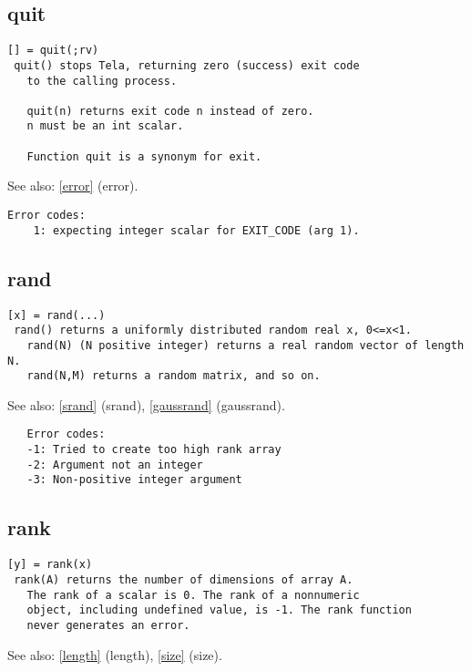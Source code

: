 \documentclass[a4paper]{article}
\begin{document}
\subsection{quit\label{quit}}

\begin{tscreen}
\begin{verbatim}
[] = quit(;rv)
 quit() stops Tela, returning zero (success) exit code
   to the calling process.

   quit(n) returns exit code n instead of zero.
   n must be an int scalar.

   Function quit is a synonym for exit.
\end{verbatim}

See also: \ref{error} {(error)}.
\begin{verbatim}
Error codes:
    1: expecting integer scalar for EXIT_CODE (arg 1).
\end{verbatim}
\end{tscreen}



\subsection{rand\label{rand}}

\begin{tscreen}
\begin{verbatim}
[x] = rand(...)
 rand() returns a uniformly distributed random real x, 0<=x<1.
   rand(N) (N positive integer) returns a real random vector of length N.
   rand(N,M) returns a random matrix, and so on.
\end{verbatim}

See also: \ref{srand} {(srand)}, \ref{gaussrand} {(gaussrand)}.
\begin{verbatim}
   Error codes:
   -1: Tried to create too high rank array
   -2: Argument not an integer
   -3: Non-positive integer argument 
\end{verbatim}
\end{tscreen}



\subsection{rank\label{rank}}

\begin{tscreen}
\begin{verbatim}
[y] = rank(x)
 rank(A) returns the number of dimensions of array A.
   The rank of a scalar is 0. The rank of a nonnumeric
   object, including undefined value, is -1. The rank function
   never generates an error.
\end{verbatim}

See also: \ref{length} {(length)}, \ref{size} {(size)}.
\end{tscreen}
\end{document}
